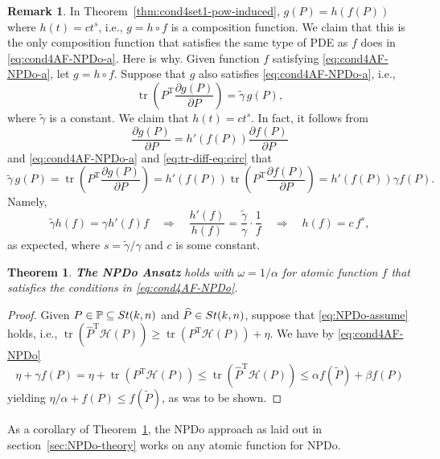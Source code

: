 \documentclass[11pt]{article}
\def\bbP{\mathbb{P}}
\def\scrH{\mathscr{H}}
\def\wtd{\widetilde}
\def\what{\widehat}
\newcommand\STM[2]{{\rm St}(#1,#2)}
\DeclareMathOperator{\tr}{tr}
\DeclareMathOperator{\T}{T}
\newtheorem{theorem}{Theorem}[section]
\theoremstyle{definition}
\newtheorem{remark}{Remark}[section]
\numberwithin{equation}{section}
\begin{document}
\begin{remark}\label{rk:induced4tr-diff-eq:2}
In Theorem~\ref{thm:cond4set1-pow-induced}, $g(P)=h(f(P))$ where $h(t)=ct^s$, i.e., $g=h\circ f$ is a composition function.
We claim that this is the only composition function that  satisfies the same type of PDE as $f$ does
in \eqref{eq:cond4AF-NPDo-a}.
Here is why. Given function $f$ satisfying \eqref{eq:cond4AF-NPDo-a}, let $g=h\circ f$. Suppose that $g$
also satisfies \eqref{eq:cond4AF-NPDo-a}, i.e.,
\begin{equation}\label{eq:tr-diff-eq:circ}
\tr\left(P^{\T}\frac{\partial g(P)}{\partial P}\right)=\tilde\gamma\, g(P),
\end{equation}
where $\tilde\gamma$ is a constant.
We claim that $h(t)=ct^s$. In fact, it follows from
$$
\frac{\partial g(P)}{\partial P}=h'(f(P))\frac{\partial f(P)}{\partial P}
$$
and \eqref{eq:cond4AF-NPDo-a} and \eqref{eq:tr-diff-eq:circ} that
$$
\tilde\gamma\, g(P)
  =\tr\left(P^{\T}\frac{\partial g(P)}{\partial P}\right)
  =h'(f(P))\tr\left(P^{\T}\frac{\partial f(P)}{\partial P}\right)
  =h'(f(P))\gamma f(P).
$$
Namely,
$$
\tilde\gamma h(f)=\gamma h'(f) f
\quad\Rightarrow\quad
\frac {h'(f)}{h(f)}=\frac {\tilde\gamma}{\gamma}\cdot\frac 1f
\quad\Rightarrow\quad
h(f)=c\,f^s,
$$
as expected, where $s=\tilde\gamma/\gamma$ and $c$ is some constant.
\end{remark}

\begin{theorem}\label{thm:NPDo-assume:AF}
{\bf The NPDo Ansatz} holds with $\omega=1/\alpha$ for atomic function $f$ that satisfies the conditions in \eqref{eq:cond4AF-NPDo}.
\end{theorem}

\begin{proof}
Given $P\in\bbP\subseteq\STM{k}{n}$ and $\what P\in\STM{k}{n}$, suppose  that \eqref{eq:NPDo-assume} holds,
i.e., $\tr(\what P^{\T}\scrH(P))\ge\tr(P^{\T}\scrH(P))+\eta$. We have by \eqref{eq:cond4AF-NPDo}
$$
\eta+\gamma f(P)=\eta+\tr(P^{\T}\scrH(P))
   \le\tr(\what P^{\T}\scrH(P))
   \le\alpha f(\wtd P)+\beta f(P)
$$
yielding $\eta/\alpha+ f(P)\le  f(\wtd P)$, as was to be shown.
\end{proof}

As a corollary of Theorem~\ref{thm:NPDo-assume:AF}, the NPDo approach as laid out in section~\ref{sec:NPDo-theory}
works on any atomic function for NPDo.
\end{document}
